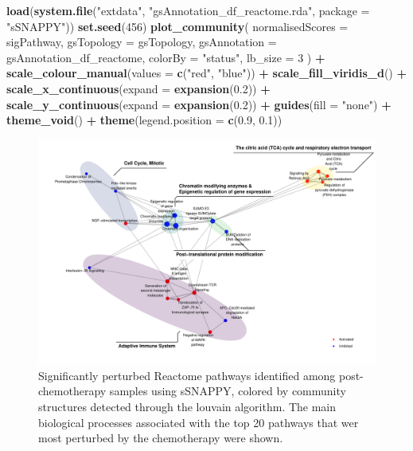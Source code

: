\documentclass[9pt,a4paper,]{extarticle}
\newenvironment{Shaded}{\begin{snugshade}}{\end{snugshade}}
\newcommand{\AttributeTok}[1]{\textcolor[rgb]{0.13,0.29,0.53}{#1}}
\newcommand{\DecValTok}[1]{\textcolor[rgb]{0.00,0.00,0.81}{#1}}
\newcommand{\FloatTok}[1]{\textcolor[rgb]{0.00,0.00,0.81}{#1}}
\newcommand{\FunctionTok}[1]{\textcolor[rgb]{0.13,0.29,0.53}{\textbf{#1}}}
\newcommand{\NormalTok}[1]{#1}
\newcommand{\SpecialCharTok}[1]{\textcolor[rgb]{0.81,0.36,0.00}{\textbf{#1}}}
\newcommand{\StringTok}[1]{\textcolor[rgb]{0.31,0.60,0.02}{#1}}
\begin{document}
\begin{Shaded}
\begin{Highlighting}[]
\FunctionTok{load}\NormalTok{(}\FunctionTok{system.file}\NormalTok{(}\StringTok{"extdata"}\NormalTok{, }\StringTok{"gsAnnotation\_df\_reactome.rda"}\NormalTok{, }\AttributeTok{package =} \StringTok{"sSNAPPY"}\NormalTok{))}
\FunctionTok{set.seed}\NormalTok{(}\DecValTok{456}\NormalTok{)}
\FunctionTok{plot\_community}\NormalTok{(}
    \AttributeTok{normalisedScores =}\NormalTok{ sigPathway,}
    \AttributeTok{gsTopology =}\NormalTok{ gsTopology, }
    \AttributeTok{gsAnnotation =}\NormalTok{ gsAnnotation\_df\_reactome,}
    \AttributeTok{colorBy =} \StringTok{"status"}\NormalTok{,}
    \AttributeTok{lb\_size =} \DecValTok{3}
\NormalTok{) }\SpecialCharTok{+}
  \FunctionTok{scale\_colour\_manual}\NormalTok{(}\AttributeTok{values =} \FunctionTok{c}\NormalTok{(}\StringTok{"red"}\NormalTok{, }\StringTok{"blue"}\NormalTok{)) }\SpecialCharTok{+}
  \FunctionTok{scale\_fill\_viridis\_d}\NormalTok{() }\SpecialCharTok{+}
  \FunctionTok{scale\_x\_continuous}\NormalTok{(}\AttributeTok{expand =} \FunctionTok{expansion}\NormalTok{(}\FloatTok{0.2}\NormalTok{)) }\SpecialCharTok{+}
  \FunctionTok{scale\_y\_continuous}\NormalTok{(}\AttributeTok{expand =} \FunctionTok{expansion}\NormalTok{(}\FloatTok{0.2}\NormalTok{)) }\SpecialCharTok{+}
  \FunctionTok{guides}\NormalTok{(}\AttributeTok{fill =} \StringTok{"none"}\NormalTok{) }\SpecialCharTok{+}
  \FunctionTok{theme\_void}\NormalTok{() }\SpecialCharTok{+}
  \FunctionTok{theme}\NormalTok{(}\AttributeTok{legend.position =} \FunctionTok{c}\NormalTok{(}\FloatTok{0.9}\NormalTok{, }\FloatTok{0.1}\NormalTok{))}
\end{Highlighting}
\end{Shaded}

\begin{figure}

{\centering \includegraphics[width=1\linewidth]{sSNAPPY_paper_files/figure-latex/Figure5-1} 

}

\caption{Significantly perturbed Reactome pathways identified among post-chemotherapy samples using sSNAPPY, colored by community structures detected through the louvain algorithm. The main biological processes associated with the top 20 pathways that wer most perturbed by the chemotherapy were shown.}\label{fig:Figure5}
\end{figure}
\end{document}
